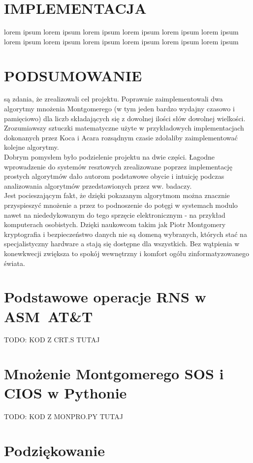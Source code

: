 \documentclass[10pt,journal,compsoc]{IEEEtran}
\begin{document}
\section{IMPLEMENTACJA}
 lorem ipsum lorem ipsum lorem ipsum lorem ipsum lorem ipsum lorem ipsum lorem ipsum lorem ipsum lorem ipsum lorem ipsum lorem ipsum lorem ipsum

\section{PODSUMOWANIE}
 są zdania, że zrealizowali cel projektu. Poprawnie zaimplementowali dwa algorytmy mnożenia Montgomerego (w tym jeden bardzo wydajny czasowo i pamięciowo) dla liczb składających się z dowolnej ilości słów dowolnej wielkości. Zrozumiawszy sztuczki matematyczne użyte w przykładowych implementacjach dokonanych przez Koca i Acara rozsądnym czasie zdołaliby zaimplementować kolejne algorytmy.  \\
Dobrym pomysłem było podzielenie projektu na dwie części. Łagodne wprowadzenie do systemów resztowych zrealizowane poprzez implementację prostych algorytmów dało autorom podstawowe obycie i intuicję podczas analizowania algorytmów przedstawionych przez ww. badaczy. \\
Jest pocieszającym fakt, że dzięki pokazanym algorytmom można znacznie przyspieszyć mnożenie a przez to podnoszenie do potęgi w systemach modulo nawet na niededykowanym do tego sprzęcie elektronicznym - na przykład komputerach osobistych. Dzięki naukowcom takim jak Piotr Montgomery kryptografia i bezpieczeństwo danych nie są domeną wybranych, których stać na specjalistyczny hardware a stają się dostępne dla wszystkich. Bez wątpienia w konewkwecji zwiększa to spokój wewnętrzny i komfort ogółu zinformatyzowanego świata.

\appendices
\section{Podstawowe operacje RNS w ASM~AT\&T}
TODO: KOD Z CRT.S TUTAJ

\section{Mnożenie Montgomerego SOS i CIOS w Pythonie}
TODO: KOD Z MONPRO.PY TUTAJ


\section*{Podziękowanie}
\end{document}
